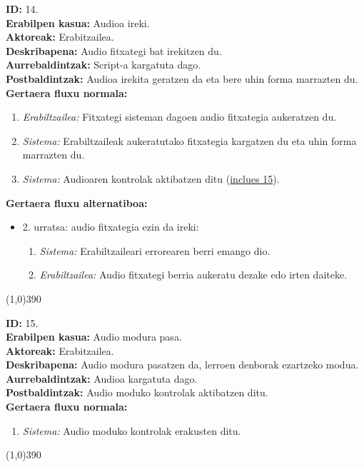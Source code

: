 \noindent
\textbf{ID:} 14.\\
\textbf{Erabilpen kasua:} Audioa ireki.\\
\textbf{Aktoreak:} Erabitzailea.\\
\textbf{Deskribapena:} Audio fitxategi bat irekitzen du.\\
\textbf{Aurrebaldintzak:} Script-a kargatuta dago.\\
\textbf{Postbaldintzak:} Audioa irekita geratzen da eta bere uhin forma marrazten du.\\
\textbf{Gertaera fluxu normala:}
\begin{enumerate}
	\item \textit{Erabiltzailea:} Fitxategi sisteman dagoen audio fitxategia aukeratzen du.
	\item \textit{Sistema:} Erabiltzaileak aukeratutako fitxategia kargatzen du eta uhin forma marrazten du.
	\item \textit{Sistema:} Audioaren kontrolak aktibatzen ditu (\underline{inclues 15}).
\end{enumerate}
\textbf{Gertaera fluxu alternatiboa:}
\begin{itemize}
	\item 2. urratsa: audio fitxategia ezin da ireki:
		\begin{enumerate}
		\item \textit{Sistema:} Erabiltzaileari errorearen berri emango dio.
		\item \textit{Erabiltzailea:} Audio fitxategi berria aukeratu dezake edo irten daiteke.
		\end{enumerate}
\end{itemize}
\line(1,0){390}

\noindent
\textbf{ID:} 15.\\
\textbf{Erabilpen kasua:} Audio modura pasa.\\
\textbf{Aktoreak:} Erabitzailea.\\
\textbf{Deskribapena:} Audio modura pasatzen da, lerroen denborak ezartzeko modua.\\
\textbf{Aurrebaldintzak:} Audioa kargatuta dago.\\
\textbf{Postbaldintzak:} Audio moduko kontrolak aktibatzen ditu.\\
\textbf{Gertaera fluxu normala:}
\begin{enumerate}
	\item \textit{Sistema:} Audio moduko kontrolak erakusten ditu.
\end{enumerate}
\line(1,0){390}

